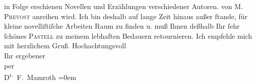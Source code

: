 \begin{ledgroupsized}[t]{13cm}
{{{                    in Folge erschienen Novellen und Erzählungen verschiedener Autoren.}}}\label{K_L00311_1h} von \textsc{M. Prevost} anreihen wird. Ich bin deshalb auf lange Zeit hinaus außer ſtande,
                    für kleine novelliſtiſche Arbeiten Raum zu finden u. muß Ihnen deßhalb Ihr ſehr
                    ſchönes \textsc{Pastell} zu meinem lebhaften Bedauern retournieren. Ich empfehle mich mit
                    herzlichem Gruß.\pend
           \pstart
           Hochachtungsvoll{\\[\baselineskip]}Ihr ergebener{\\[\baselineskip]}per{\\[\baselineskip]}\spacefill\mbox{D\textsuperscript{r.} F. Mamroth}\pend
           \leftskip=0em{}\endnumbering{}\end{ledgroupsized}  \newcommand{\dateiname}{L00311}\newcommand{\titel}{Fedor Mamroth an Arthur Schnitzler, 4. 4. 1894}\newcommand{\editorInnen}{Martin Anton Müller und Gerd-Hermann Susen}
      